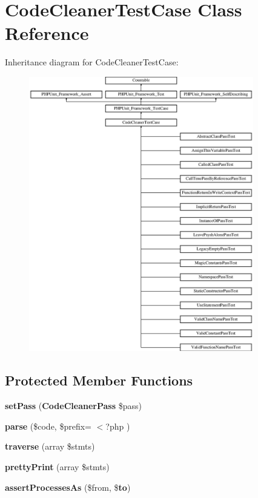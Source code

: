 \section{Code\+Cleaner\+Test\+Case Class Reference}
\label{class_psy_1_1_test_1_1_code_cleaner_1_1_code_cleaner_test_case}
Inheritance diagram for Code\+Cleaner\+Test\+Case\+:\begin{figure}[H]
\begin{center}
\leavevmode
\includegraphics[height=12.000000cm]{class_psy_1_1_test_1_1_code_cleaner_1_1_code_cleaner_test_case}
\end{center}
\end{figure}
\subsection*{Protected Member Functions}
\begin{DoxyCompactItemize}
\item 
{\bf set\+Pass} ({\bf Code\+Cleaner\+Pass} \$pass)
\item 
{\bf parse} (\$code, \$prefix= \textquotesingle{}$<$?php \textquotesingle{})
\item 
{\bf traverse} (array \$stmts)
\item 
{\bf pretty\+Print} (array \$stmts)
\item 
{\bf assert\+Processes\+As} (\$from, \${\bf to})
\end{DoxyCompactItemize}
